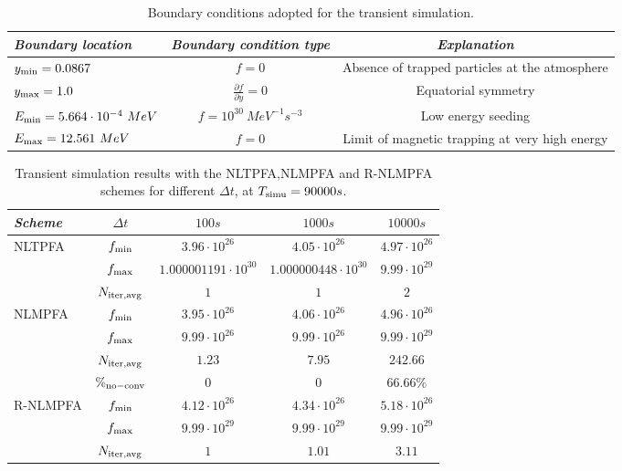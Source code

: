 \documentclass[final,11pt]{elsarticle}
\begin{document}
\begin{center}
\begin{table}[ht!]
\caption{Boundary conditions adopted for the transient simulation.}
\label{tab:bc}
\centering
\begin{tabular}{|l|c|c|}
\hline
\emph{Boundary location} & \emph{Boundary condition type}&\emph{Explanation}\\
\hline
$y_{\rm min}=0.0867$& $f=0$& Absence of trapped particles at the atmosphere\\
\hline
$y_{\rm max}=1.0$&$\frac{\partial f}{\partial y}=0$& Equatorial symmetry\\
\hline
$E_{\rm min}=5.664\cdot 10^{-4}~MeV$&$f=10^{30}~ MeV^{-1}s^{-3}$& Low energy seeding\\
\hline
$E_{\rm max}=12.561~MeV$&$f=0$& Limit of magnetic trapping at very high energy\\
\hline
\end{tabular}
\end{table}
\end{center}


\begin{table}[ht!]\renewcommand{\arraystretch}{1.2}
\caption{Transient simulation results with the NLTPFA,NLMPFA and R-NLMPFA schemes for different $\Delta t$, at $T_{\rm simu}=90000s$.}
\label{tab_NLTPFA_vs_NLMPFA_vs_NLMONOT_transient}
\centering
\begin{tabular}{|l|c|c|c|c|}
 	\hline
	\emph{Scheme}& $\Delta t$ &$100s$&$1000s$&$10000s$\\
    \hline
    NLTPFA & $f_{\rm min}$ &$3.96\cdot 10^{26}$ &$4.05\cdot 10^{26}$ &$4.97\cdot 10^{26}$\\
    \cline{2-5}
        & $f_{\rm max}$ &$1.000001191\cdot 10^{30}$ &$1.000000448\cdot 10^{30}$ &$9.99\cdot 10^{29}$  \\
    \cline{2-5}
        & $N_{\rm iter, \rm avg}$ &$1$ &$1$ &$2$  \\
    \hline
    NLMPFA & $f_{\rm min}$ &$3.95\cdot 10^{26}$ &$4.06\cdot 10^{26}$ &$4.96\cdot 10^{26}$\\
    \cline{2-5}
        & $f_{\rm max}$ &$9.99\cdot 10^{26}$ &$9.99\cdot 10^{26}$ &$9.99\cdot 10^{29}$  \\
    \cline{2-5}
        & $N_{\rm iter, \rm avg}$ &$1.23$ &$7.95$ &$242.66$  \\
    \cline{2-5}
        & $\%_{\rm no-conv}$ &$0$ &$0$ &$66.66\%$  \\
    \hline
    R-NLMPFA & $f_{\rm min}$ &$4.12\cdot 10^{26}$&$4.34\cdot 10^{26}$&$5.18\cdot 10^{26}$\\
    \cline{2-5}
        & $f_{\rm max}$ &$9.99\cdot 10^{29}$&$9.99\cdot 10^{29}$&$9.99\cdot 10^{29}$\\
    \cline{2-5}
        & $N_{\rm iter, \rm avg}$ &$1$&$1.01$&$3.11$\\
    \hline
    \end{tabular}
\end{table}
\end{document}
